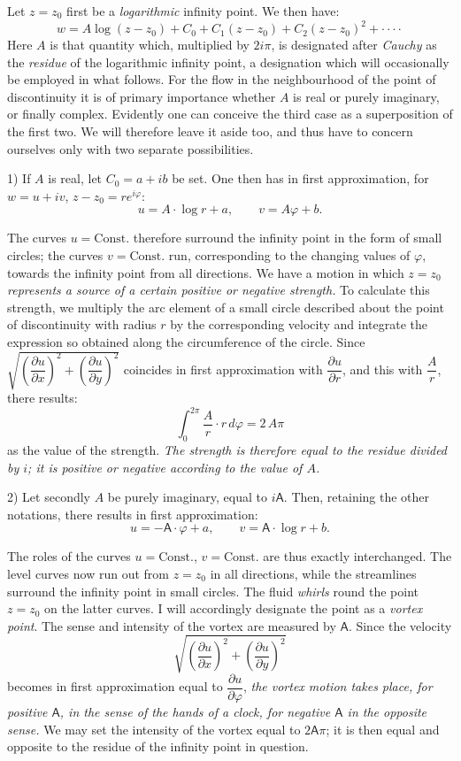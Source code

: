 \documentclass{article}
\begin{document}
Let $z = z_{0}$ first be a \emph{logarithmic} infinity point. We then have:
\[ w = A \log (z - z_{0}) + C_{0} + C_{1} (z - z_{0}) + C_{2} (z - z_{0})^{2} + \cdot\cdot\cdot\cdot \]
Here $A$ is that quantity which, multiplied by $2i\pi$, is designated after \emph{Cauchy} as the \emph{residue} of the logarithmic infinity point, a designation which will occasionally be employed in what follows. For the flow in the neighbourhood of the point of discontinuity it is of primary importance whether $A$ is real or purely imaginary, or finally complex. Evidently one can conceive the third case as a superposition of the first two. We will therefore leave it aside too, and thus have to concern ourselves only with two separate possibilities.

1) If $A$ is real, let $C_{0} = a + ib$ be set. One then has in first approximation, for $w = u + iv$, $z - z_{0} = re^{i\varphi}$:
\[ u = A \cdot \log r + a, \qquad v = A\varphi + b. \]

The curves $u = \text{Const.}$ therefore surround the infinity point in the form of small circles; the curves $v = \text{Const.}$ run, corresponding to the changing values of $\varphi$, towards the infinity point from all directions. We have a motion in which $z = z_{0}$ \emph{represents a source of a certain positive or negative strength.} To calculate this strength, we multiply the arc element of a small circle described about the point of discontinuity with radius $r$ by the corresponding velocity and integrate the expression so obtained along the circumference of the circle. Since $\sqrt{\left(\dfrac{\partial u}{\partial x}\right)^{2} + \left(\dfrac{\partial u}{\partial y}\right)^{2}}$ coincides in first approximation with $\dfrac{\partial u}{\partial r}$, and this with $\dfrac{A}{r}$, there results:
\[ \int_{0}^{2\pi} \frac{A}{r} \cdot r\,d\varphi = 2\,A\pi \]
as the value of the strength. \emph{The strength is therefore equal to the residue divided by $i$; it is positive or negative according to the value of $A$.}


2) Let secondly $A$ be purely imaginary, equal to $i\mathsf{A}$. Then, retaining the other notations, there results in first approximation:
\[ u = -\mathsf{A} \cdot \varphi + a, \qquad v = \mathsf{A} \cdot \log r + b. \]

The roles of the curves $u = \text{Const.}$, $v = \text{Const.}$ are thus exactly interchanged. The level curves now run out from $z = z_{0}$ in all directions, while the streamlines surround the infinity point in small circles. The fluid \emph{whirls} round the point $z = z_{0}$ on the latter curves. I will accordingly designate the point as a \emph{vortex point}. The sense and intensity of the vortex are measured by $\mathsf{A}$. Since the velocity
\[ \sqrt{\left(\frac{\partial u}{\partial x}\right)^{2} + \left(\frac{\partial u}{\partial y}\right)^{2}} \]
becomes in first approximation equal to $\dfrac{\partial u}{\partial \varphi}$, \emph{the vortex motion takes place, for positive $\mathsf{A}$, in the sense of the hands of a clock, for negative $\mathsf{A}$ in the opposite sense.} We may set the intensity of the vortex equal to $2\mathsf{A}\pi$; it is then equal and opposite to the residue of the infinity point in question.
\end{document}
